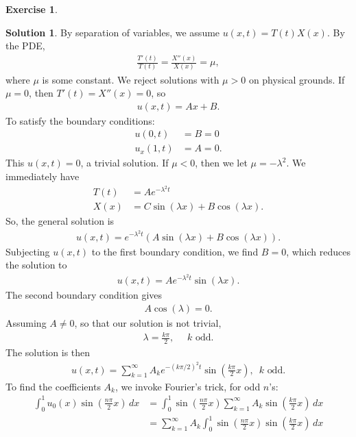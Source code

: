\documentclass{article}
\theoremstyle{definition}
\newtheorem*{exer*}{Exercise}
\newtheorem*{sln*}{Solution}
\begin{document}
\begin{exer*}
\begin{sln*}
		\noindent By separation of variables, we assume $u(x,t) = T(t)X(x)$. By the PDE, 
		\begin{align*}
		\frac{T'(t)}{T(t)} = \frac{X''(x)}{X(x)} = \mu,
		\end{align*}
		where $\mu$ is some constant. We reject solutions with $\mu > 0$ on physical grounds. If $\mu = 0$, then $T'(t) = X''(x) = 0$, so
		\begin{align*}
		u(x,t) = Ax + B.
		\end{align*}
		To satisfy the boundary conditions:
		\begin{align*}
		u(0,t) &= B = 0\\
		u_x(1,t) &= A = 0.
		\end{align*}
		This $u(x,t) = 0$, a trivial solution. If $\mu < 0$, then we let $\mu = -\lambda^2$. We immediately have
		\begin{align*}
		T(t) &= Ae^{-\lambda^2 t}\\
		X(x) &= C\sin(\lambda x) + B\cos(\lambda x).
		\end{align*}
		So, the general solution is
		\begin{align*}
		u(x,t) = e^{-\lambda^2 t}(A\sin(\lambda x) + B\cos(\lambda x)).
		\end{align*}
		Subjecting $u(x,t)$ to the first boundary condition, we find $B = 0$, which reduces the solution to
		\begin{align*}
		u(x,t) = Ae^{-\lambda^2 t}\sin(\lambda x).
		\end{align*}
		The second boundary condition gives
		\begin{align*}
		A\cos(\lambda)= 0.
		\end{align*}
		Assuming $A\neq 0$, so that our solution is not trivial, 
		\begin{align*}
		\lambda = \frac{k\pi}{2},\,\,\,\,\,\,\,\, k \text{ odd}.
		\end{align*}
		The solution is then
		\begin{align*}
		u(x,t) = \sum_{k=1}^{\infty}A_ke^{-(k\pi/2)^2t}\sin\left(\frac{k\pi}{2} x\right), \,\,\, k \text{ odd}.
		\end{align*}
		To find the coefficients $A_k$, we invoke Fourier's trick, for odd $n$'s:
		\begin{align*}
		\int_{0}^1 u_0(x)\sin\left(\frac{n\pi}{2} x\right)\,dx &= \int_0^1 \sin\left(\frac{n\pi}{2} x\right)\sum_{k=1}^\infty A_k\sin\left(\frac{k\pi}{2} x\right)\,dx\\
		&= \sum_{k=1}^\infty A_k \int_{0}^1 \sin\left(\frac{n\pi}{2} x\right)\sin\left(\frac{k\pi}{2} x\right)\,dx\\

\end{align*}
\end{sln*}
\end{exer*}
\end{document}
